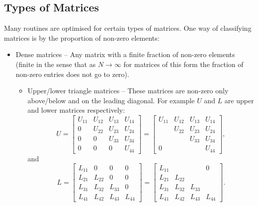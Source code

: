 \documentclass[a4paper]{article}
\begin{document}
    \subsection{Types of Matrices}
    Many routines are optimised for certain types of matrices.
    One way of classifying matrices is by the proportion of non-zero elements:
    \begin{itemize}
        \item Dense matrices -- Any matrix with a finite fraction of non-zero elements (finite in the sense that as \(N\to\infty\) for matrices of this form the fraction of non-zero entries does not go to zero).
        \begin{itemize}
            \item Upper/lower triangle matrices -- These matrices are non-zero only above/below and on the leading diagonal.
            For example \(U\) and \(L\) are upper and lower matrices respectively:
            \[
                U = 
                \begin{bmatrix}
                	U_{11} & U_{12} & U_{13} & U_{14} \\
                	0      & U_{22} & U_{23} & U_{24} \\
                	0      & 0      & U_{33} & U_{34} \\
                	0      & 0      & 0      & U_{44}
                \end{bmatrix}
                =
                \begin{bmatrix}
                    U_{11} & U_{12} & U_{13} & U_{14} \\
                           & U_{22} & U_{23} & U_{24} \\
                           &        & U_{33} & U_{34} \\
                    0      &        &        & U_{44}
                \end{bmatrix}
                ,
            \]
            and
            \[
                L = 
                \begin{bmatrix}
                	L_{11} & 0      & 0      & 0      \\
                	L_{21} & L_{22} & 0      & 0      \\
                	L_{31} & L_{32} & L_{33} & 0      \\
                	L_{41} & L_{42} & L_{43} & L_{44}
                \end{bmatrix}
                =
                \begin{bmatrix}
                    L_{11} &        &        & 0      \\
                    L_{21} & L_{22} &        &        \\
                    L_{31} & L_{32} & L_{33} &        \\
                    L_{41} & L_{42} & L_{43} & L_{44}
                \end{bmatrix}
                .
            \]
            

\end{itemize}
\end{itemize}
\end{document}
